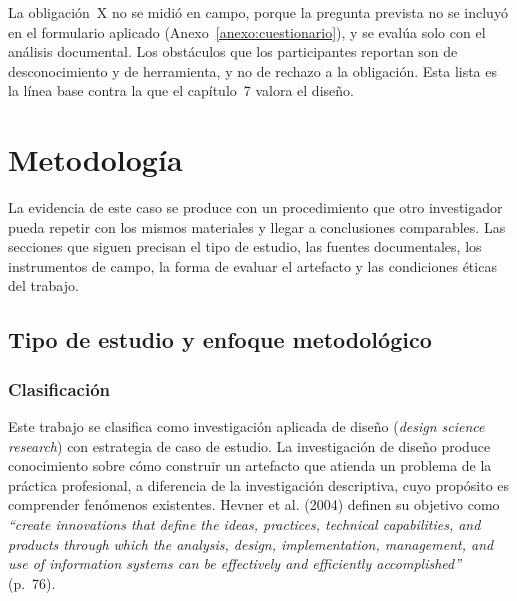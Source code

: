 \documentclass[12pt, a4paper]{article}
\makeatletter
\newcommand{\saltoseccion}{\par
  \ifx\@deferlist\@empty
    \ifdim\pagegoal<\maxdimen
      \ifdim\dimexpr\textheight-\pagegoal+\pagetotal\relax>0.5\textheight\clearpage\fi
    \fi
  \else\clearpage\fi}
\let\seccionbase\section
\renewcommand{\section}{\saltoseccion\seccionbase}
\makeatother
\begin{document}
La obligación~X no se midió en campo, porque la pregunta prevista no se
incluyó en el formulario aplicado (Anexo~\ref{anexo:cuestionario}), y se
evalúa solo con el análisis documental. Los obstáculos que los
participantes reportan son de desconocimiento y de herramienta, y no de
rechazo a la obligación. Esta lista es la línea base contra la que el
capítulo~7 valora el diseño.
 
\section{Metodología}
 
La evidencia de este caso se produce con un procedimiento que otro
investigador pueda repetir con los mismos materiales y llegar a
conclusiones comparables. Las secciones que siguen precisan el tipo de
estudio, las fuentes documentales, los instrumentos de campo, la forma
de evaluar el artefacto y las condiciones éticas del trabajo.
 
\subsection{Tipo de estudio y enfoque metodológico}
 
\subsubsection{Clasificación}
 
Este trabajo se clasifica como investigación aplicada de diseño
(\textit{design science research}) con estrategia de caso de estudio.
La investigación de diseño produce conocimiento sobre cómo construir un
artefacto que atienda un problema de la práctica profesional, a
diferencia de la investigación descriptiva, cuyo propósito es comprender
fenómenos existentes. Hevner et al. (2004) definen su objetivo como
\textit{``create innovations that define the ideas, practices, technical
capabilities, and products through which the analysis, design,
implementation, management, and use of information systems can be
effectively and efficiently accomplished''} (p.~76).
 
\end{document}
